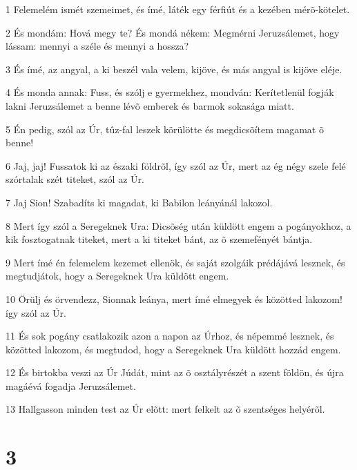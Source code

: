 \par 1 Felemelém ismét szemeimet, és ímé, láték egy férfiút és a kezében mérõ-kötelet.
\par 2 És mondám: Hová megy te? És mondá nékem: Megmérni Jeruzsálemet, hogy lássam: mennyi a széle és mennyi a hossza?
\par 3 És ímé, az angyal, a ki beszél vala velem, kijöve, és más angyal is kijöve eléje.
\par 4 És monda annak: Fuss, és szólj e gyermekhez, mondván: Kerítetlenül fogják lakni Jeruzsálemet a benne lévõ emberek és barmok sokasága miatt.
\par 5 Én pedig, szól az Úr, tûz-fal leszek körülötte és megdicsõítem magamat õ benne!
\par 6 Jaj, jaj! Fussatok ki az északi földrõl, így szól az Úr, mert az ég négy szele felé szórtalak szét titeket, szól az Úr.
\par 7 Jaj Sion! Szabadíts ki magadat, ki Babilon leányánál lakozol.
\par 8 Mert így szól a Seregeknek Ura: Dicsõség után küldött engem a pogányokhoz, a kik fosztogatnak titeket, mert a ki titeket bánt, az õ szemefényét bántja.
\par 9 Mert ímé én felemelem kezemet ellenök, és saját szolgáik prédájává lesznek, és megtudjátok, hogy a Seregeknek Ura küldött engem.
\par 10 Örülj és örvendezz, Sionnak leánya, mert ímé elmegyek és közötted lakozom! így szól az Úr.
\par 11 És sok pogány csatlakozik azon a napon az Úrhoz, és népemmé lesznek, és közötted lakozom, és megtudod, hogy a Seregeknek Ura küldött hozzád engem.
\par 12 És birtokba veszi az Úr Júdát, mint az õ osztályrészét a szent földön, és újra magáévá fogadja Jeruzsálemet.
\par 13 Hallgasson minden test az Úr elõtt: mert felkelt az õ szentséges helyérõl.

\chapter{3}

